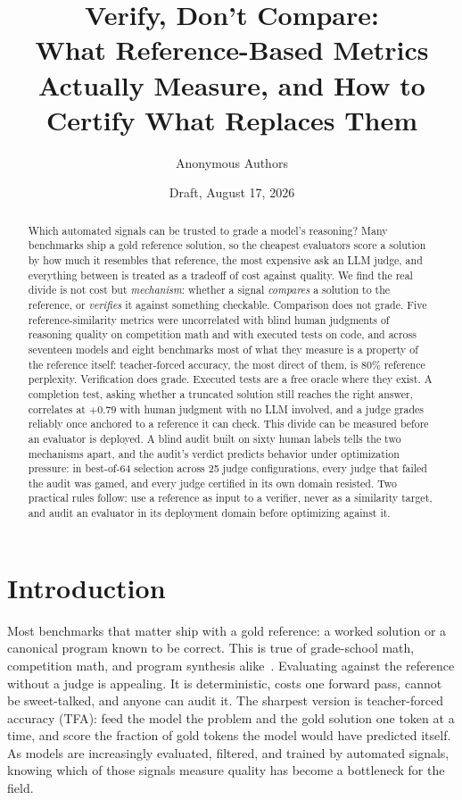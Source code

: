 \documentclass[11pt]{article}
\title{Verify, Don't Compare:\\ \large What Reference-Based Metrics Actually Measure, and How to Certify What Replaces Them}
\author{Anonymous Authors}
\date{Draft, August 17, 2026}
\newcommand{\tfa}{\textsc{TFA}}
\begin{document}
\maketitle

\begin{abstract}
Which automated signals can be trusted to grade a model's reasoning?
Many benchmarks ship a gold reference solution, so the cheapest evaluators score a solution by how much it resembles that reference, the most expensive ask an LLM judge, and everything between is treated as a tradeoff of cost against quality.
We find the real divide is not cost but \emph{mechanism}: whether a signal \emph{compares} a solution to the reference, or \emph{verifies} it against something checkable.
Comparison does not grade.
Five reference-similarity metrics were uncorrelated with blind human judgments of reasoning quality on competition math and with executed tests on code, and across seventeen models and eight benchmarks most of what they measure is a property of the reference itself: teacher-forced accuracy, the most direct of them, is $80\%$ reference perplexity.
Verification does grade.
Executed tests are a free oracle where they exist.
A completion test, asking whether a truncated solution still reaches the right answer, correlates at $+0.79$ with human judgment with no LLM involved, and a judge grades reliably once anchored to a reference it can check.
This divide can be measured before an evaluator is deployed.
A blind audit built on sixty human labels tells the two mechanisms apart, and the audit's verdict predicts behavior under optimization pressure: in best-of-64 selection across 25 judge configurations, every judge that failed the audit was gamed, and every judge certified in its own domain resisted.
Two practical rules follow: use a reference as input to a verifier, never as a similarity target, and audit an evaluator in its deployment domain before optimizing against it.
\end{abstract}

\section{Introduction}
\label{sec:intro}

Most benchmarks that matter ship with a gold reference: a worked solution or a canonical program known to be correct.
This is true of grade-school math, competition math, and program synthesis alike~\cite{cobbe2021gsm8k,hendrycks2021math,chen2021codex}.
Evaluating against the reference without a judge is appealing.
It is deterministic, costs one forward pass, cannot be sweet-talked, and anyone can audit it.
The sharpest version is teacher-forced accuracy (\tfa): feed the model the problem and the gold solution one token at a time, and score the fraction of gold tokens the model would have predicted itself.
As models are increasingly evaluated, filtered, and trained by automated signals, knowing which of those signals measure quality has become a bottleneck for the field.
\end{document}
